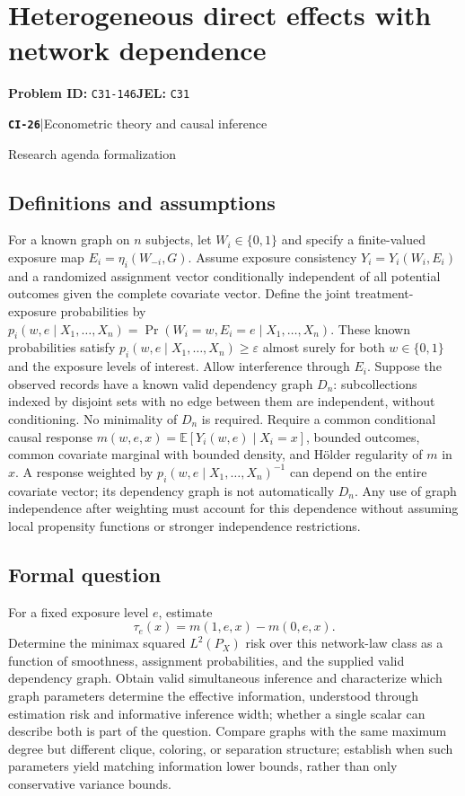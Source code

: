 \documentclass[11pt,a4paper]{article}
\newcommand{\E}{\mathbb E}
\newcommand{\entrymeta}[3]{{\sffamily\small\color{muted}\textbf{\texttt{#1}}\quad|\quad #2\par #3\par}}
\begin{document}
\section*{Heterogeneous direct effects with network dependence}
\textbf{Problem ID:} \texttt{C31-146}\quad \textbf{JEL:} \texttt{C31}\par
\label{problem:OP-0505}
\label{beyond:CI-26}
\entrymeta{CI-26}{Econometric theory and causal inference}{Research agenda formalization}
\subsection*{Definitions and assumptions}
For a known graph on $n$ subjects, let $W_i\in\{0,1\}$ and specify a finite-valued exposure map $E_i=\eta_i(W_{-i},G)$. Assume exposure consistency $Y_i=Y_i(W_i,E_i)$ and a randomized assignment vector conditionally independent of all potential outcomes given the complete covariate vector. Define the joint treatment-exposure probabilities by $p_i(w,e\mid X_1,\ldots,X_n)=\Pr(W_i=w,E_i=e\mid X_1,\ldots,X_n)$. These known probabilities satisfy $p_i(w,e\mid X_1,\ldots,X_n)\geq\varepsilon$ almost surely for both $w\in\{0,1\}$ and the exposure levels of interest. Allow interference through $E_i$. Suppose the observed records have a known valid dependency graph $D_n$: subcollections indexed by disjoint sets with no edge between them are independent, without conditioning. No minimality of $D_n$ is required. Require a common conditional causal response $m(w,e,x)=\E[Y_i(w,e)\mid X_i=x]$, bounded outcomes, common covariate marginal with bounded density, and H\"older regularity of $m$ in $x$. A response weighted by $p_i(w,e\mid X_1,\ldots,X_n)^{-1}$ can depend on the entire covariate vector; its dependency graph is not automatically $D_n$. Any use of graph independence after weighting must account for this dependence without assuming local propensity functions or stronger independence restrictions.
\subsection*{Formal question}
For a fixed exposure level $e$, estimate
\[
 \tau_e(x)=m(1,e,x)-m(0,e,x).
\]
Determine the minimax squared $L^2(P_X)$ risk over this network-law class as a function of smoothness, assignment probabilities, and the supplied valid dependency graph. Obtain valid simultaneous inference and characterize which graph parameters determine the effective information, understood through estimation risk and informative inference width; whether a single scalar can describe both is part of the question. Compare graphs with the same maximum degree but different clique, coloring, or separation structure; establish when such parameters yield matching information lower bounds, rather than only conservative variance bounds.
\end{document}
